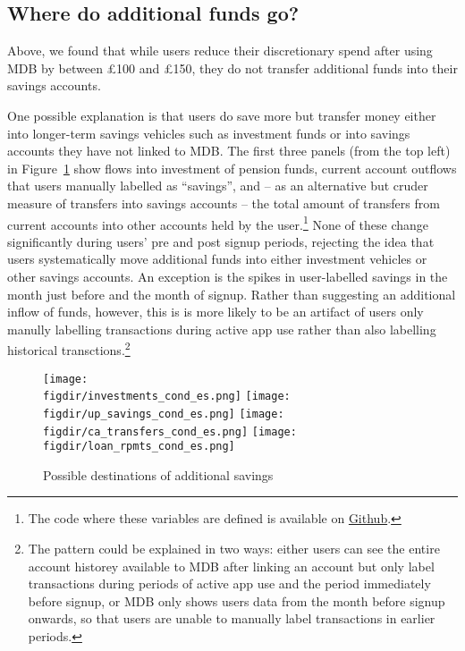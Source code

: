 \subsection{Where do additional funds go?}%
\label{sub:where_do_additional_funds_go_}

Above, we found that while users reduce their discretionary spend after using
MDB by between \pounds100 and \pounds150, they do not transfer additional funds
into their savings accounts.

One possible explanation is that users do save more but transfer money either
into longer-term savings vehicles such as investment funds or into savings
accounts they have not linked to MDB. The first three panels (from the top
left) in Figure~\ref{fig:wdmg} show flows into investment of pension funds,
current account outflows that users manually labelled as ``savings'', and -- as
an alternative but cruder measure of transfers into savings accounts -- the
total amount of transfers from current accounts into other accounts held by the
user.\footnote{The code where these variables are defined is available on
\href{https://github.com/fabiangunzinger/mdb_eval/blob/f31bfcd7a330188cdd27968d41957ebf5b454099/src/data/aggregators.py\#L300}{Github}.}
None of these change significantly during users' pre and post signup periods,
rejecting the idea that users systematically move additional funds into either
investment vehicles or other savings accounts. An exception is the spikes in
user-labelled savings in the month just before and the month of signup. Rather
than suggesting an additional inflow of funds, however, this is is more likely
to be an artifact of users only manully labelling transactions during active
app use rather than also labelling historical transctions.\footnote{The pattern
    could be explained in two ways: either users can see the entire account
    historey available to MDB after linking an account but only label
    transactions during periods of active app use and the period immediately
before signup, or MDB only shows users data from the month before signup
onwards, so that users are unable to manually label transactions in earlier
periods.}

\begin{figure}[h]
    \centering
    \caption{Possible destinations of additional savings}%
    \label{fig:wdmg}
    \texttt{[image: \\figdir/investments\_cond\_es.png]}
    \texttt{[image: \\figdir/up\_savings\_cond\_es.png]}
    \texttt{[image: \\figdir/ca\_transfers\_cond\_es.png]}
    \texttt{[image: \\figdir/loan\_rpmts\_cond\_es.png]}
\end{figure}

